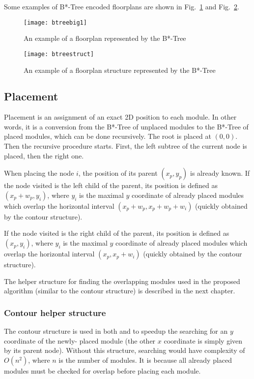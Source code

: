 Some examples of B*-Tree encoded floorplans are shown in Fig.~\ref{fig:btreef} and Fig.~\ref{fig:btrees}.

\begin{figure}
\centering
\texttt{[image: btreebig1]}
\caption{An example of a floorplan represented by the B*-Tree}
\label{fig:btreef}
\end{figure}

\begin{figure}
\centering
\texttt{[image: btreestruct]}
\caption{An example of a floorplan structure represented by the B*-Tree}
\label{fig:btrees}
\end{figure}

\subsection{Placement}

Placement is an assignment of an exact 2D position to each module. In other words, it is a conversion from the B*-Tree of unplaced modules to the B*-Tree of placed modules, which can be done recursively. The root is placed at $(0, 0)$. Then the recursive procedure starts. First, the left subtree of the current node is placed, then the right one.  

When placing the node $i$, the position of its parent $(x_p, y_p)$ is already known. If the node visited is the left child of the parent, its position is defined as $(x_p+w_p, y_i)$, where $y_i$ is the maximal $y$ coordinate of already placed modules which overlap the horizontal interval $(x_p+w_p, x_p+w_p+w_i)$ (quickly obtained by the contour structure). 

If the node visited is the right child of the parent, its position is defined as $(x_p, y_i)$, where $y_i$ is the maximal $y$ coordinate of already placed modules which overlap the horizontal interval $(x_p, x_p+w_i)$ (quickly obtained by the contour structure). 

The helper structure for finding the overlapping modules used in the proposed algorithm (similar to the contour structure) is described in the next chapter.

\subsubsection{Contour helper structure}

The contour structure is used in both \cite{otree} and \cite{btree} to speedup the searching for an $y$ coordinate of the newly- placed module (the other $x$ coordinate is simply given by its parent node). Without this structure, searching would have complexity of $O(n^2)$, where $n$ is the number of modules. It is because all already placed modules must be checked for overlap before placing each module. 

